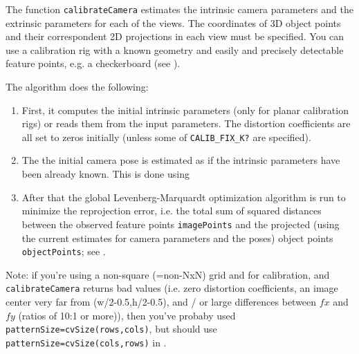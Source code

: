 \begin{description}
\begin{description}
{\begin{description}
\end{description}}
\end{description}

The function \texttt{calibrateCamera} estimates the intrinsic camera
parameters and the extrinsic parameters for each of the views. The
coordinates of 3D object points and their correspondent 2D projections
in each view must be specified. You can use a calibration rig with a known geometry and easily and precisely detectable feature points, e.g. a checkerboard (see ).

The algorithm does the following:
\begin{enumerate}
    \item First, it computes the initial intrinsic parameters (only for planar calibration rigs) or reads them from the input parameters. The distortion coefficients are all set to zeros initially (unless some of \texttt{CALIB\_FIX\_K?} are specified).
    \item The the initial camera pose is estimated as if the intrinsic parameters have been already known. This is done using 
    \item After that the global Levenberg-Marquardt optimization algorithm is run to minimize the reprojection error, i.e. the total sum of squared distances between the observed feature points \texttt{imagePoints} and the projected (using the current estimates for camera parameters and the poses) object points \texttt{objectPoints}; see .
\end{enumerate}

Note: if you're using a non-square (=non-NxN) grid and
 for calibration, and \texttt{calibrateCamera} returns
bad values (i.e. zero distortion coefficients, an image center very far from
(w/2-0.5,h/2-0.5), and / or large differences between $fx$ and $fy$ (ratios of
10:1 or more)), then you've probaby used \texttt{patternSize=cvSize(rows,cols)},
but should use \texttt{patternSize=cvSize(cols,rows)} in .


\end{description}
